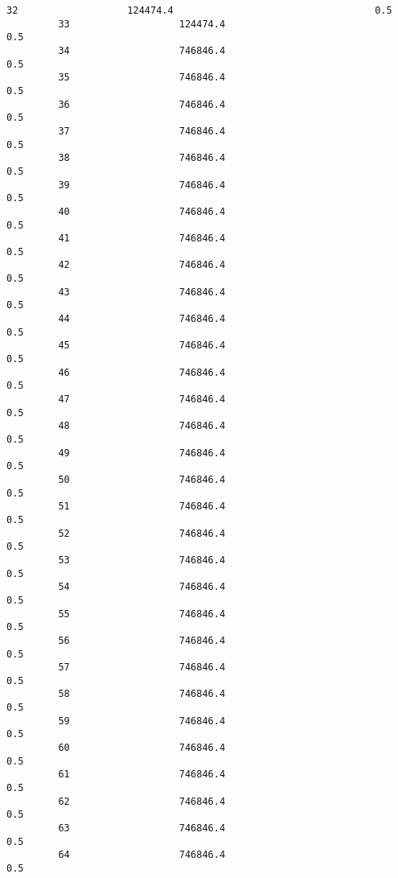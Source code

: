 \documentclass{article}
\begin{document}
\begin{Verbatim}[commandchars=\\\{\}]
         32                   124474.4                                   0.5  
         33                   124474.4                                   0.5  
         34                   746846.4                                   0.5  
         35                   746846.4                                   0.5  
         36                   746846.4                                   0.5  
         37                   746846.4                                   0.5  
         38                   746846.4                                   0.5  
         39                   746846.4                                   0.5  
         40                   746846.4                                   0.5  
         41                   746846.4                                   0.5  
         42                   746846.4                                   0.5  
         43                   746846.4                                   0.5  
         44                   746846.4                                   0.5  
         45                   746846.4                                   0.5  
         46                   746846.4                                   0.5  
         47                   746846.4                                   0.5  
         48                   746846.4                                   0.5  
         49                   746846.4                                   0.5  
         50                   746846.4                                   0.5  
         51                   746846.4                                   0.5  
         52                   746846.4                                   0.5  
         53                   746846.4                                   0.5  
         54                   746846.4                                   0.5  
         55                   746846.4                                   0.5  
         56                   746846.4                                   0.5  
         57                   746846.4                                   0.5  
         58                   746846.4                                   0.5  
         59                   746846.4                                   0.5  
         60                   746846.4                                   0.5  
         61                   746846.4                                   0.5  
         62                   746846.4                                   0.5  
         63                   746846.4                                   0.5  
         64                   746846.4                                   0.5  

\end{Verbatim}
\end{document}
